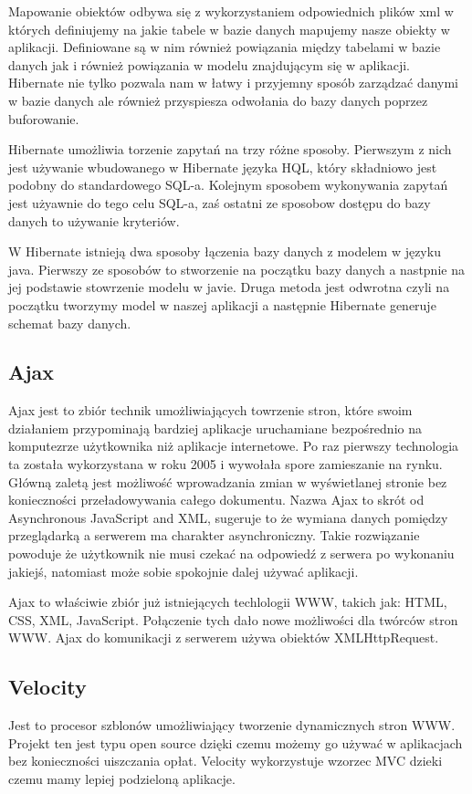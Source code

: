 Mapowanie obiektów odbywa się z wykorzystaniem 
odpowiednich plików xml w których definiujemy na jakie tabele w bazie danych mapujemy nasze obiekty w
aplikacji. Definiowane są w nim również powiązania między tabelami w bazie danych jak i również 
powiązania w modelu znajdującym się w aplikacji.
 Hibernate nie tylko pozwala nam w łatwy i przyjemny sposób zarządzać danymi w bazie danych ale również
przyspiesza odwołania do bazy danych poprzez buforowanie.

Hibernate umożliwia torzenie zapytań na trzy różne sposoby. Pierwszym z nich jest używanie wbudowanego
w Hibernate języka HQL, który składniowo jest podobny do standardowego SQL-a. Kolejnym sposobem wykonywania
zapytań jest użyawnie do tego celu SQL-a, zaś ostatni ze sposobow dostępu do bazy danych to używanie 
kryteriów.

W Hibernate istnieją dwa sposoby łączenia bazy danych z modelem w języku java. Pierwszy ze sposobów to
stworzenie na początku bazy danych a nastpnie na jej podstawie stowrzenie modelu w javie. Druga metoda jest 
odwrotna czyli na początku tworzymy model w naszej aplikacji a następnie Hibernate generuje schemat
bazy danych.
\subsection{Ajax}
Ajax jest to zbiór technik umożliwiających towrzenie stron, które swoim działaniem przypominają bardziej 
aplikacje uruchamiane bezpośrednio na komputezrze użytkownika niż aplikacje internetowe. Po raz pierwszy
technologia ta została wykorzystana w roku 2005 i wywołała spore zamieszanie na rynku. 
 Główną zaletą jest 
możliwość wprowadzania zmian w wyświetlanej stronie bez konieczności przeładowywania całego dokumentu. Nazwa
Ajax to skrót od Asynchronous JavaScript and XML, sugeruje to że wymiana danych pomiędzy przeglądarką a 
serwerem ma charakter asynchroniczny. Takie rozwiązanie powoduje że użytkownik nie musi czekać na odpowiedź
z serwera po wykonaniu jakiejś, natomiast może sobie spokojnie dalej używać aplikacji.

Ajax to właściwie zbiór już istniejących techlologii WWW, takich jak: HTML, CSS, XML, JavaScript. Połączenie
tych dało nowe możliwości dla twórców stron WWW.
 Ajax do komunikacji z serwerem używa obiektów XMLHttpRequest.

\subsection{Velocity}
Jest to procesor szblonów umożliwiający tworzenie dynamicznych stron WWW. Projekt ten jest typu open source
dzięki czemu możemy go używać w aplikacjach bez konieczności uiszczania opłat. Velocity wykorzystuje wzorzec
MVC dzieki czemu mamy lepiej podzieloną aplikacje. 
